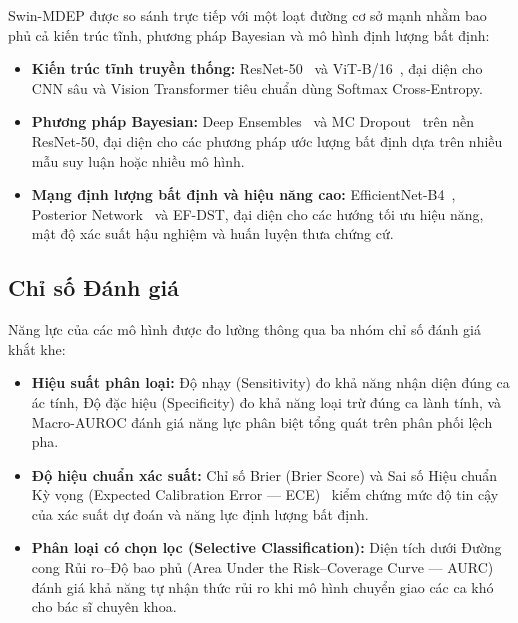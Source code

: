 \documentclass[11pt, a4paper]{article}
\begin{document}
Swin-MDEP được so sánh trực tiếp với một loạt đường cơ sở mạnh nhằm bao phủ cả kiến trúc tĩnh, phương pháp Bayesian và mô hình định lượng bất định:
\begin{itemize}
    \item \textbf{Kiến trúc tĩnh truyền thống:} ResNet-50~\cite{he2016deep} và ViT-B/16~\cite{dosovitskiy2021image}, đại diện cho CNN sâu và Vision Transformer tiêu chuẩn dùng Softmax Cross-Entropy.
    \item \textbf{Phương pháp Bayesian:} Deep Ensembles~\cite{lakshminarayanan2017simple} và MC Dropout~\cite{gal2016dropout} trên nền ResNet-50, đại diện cho các phương pháp ước lượng bất định dựa trên nhiều mẫu suy luận hoặc nhiều mô hình.
    \item \textbf{Mạng định lượng bất định và hiệu năng cao:} EfficientNet-B4~\cite{tan2019efficientnet}, Posterior Network~\cite{charpentier2020posterior} và EF-DST, đại diện cho các hướng tối ưu hiệu năng, mật độ xác suất hậu nghiệm và huấn luyện thưa chứng cứ.
\end{itemize}

\subsection{Chỉ số Đánh giá}\label{subsec:metrics}

Năng lực của các mô hình được đo lường thông qua ba nhóm chỉ số đánh giá khắt khe:
\begin{itemize}
    \item \textbf{Hiệu suất phân loại:} Độ nhạy (Sensitivity) đo khả năng nhận diện đúng ca ác tính, Độ đặc hiệu (Specificity) đo khả năng loại trừ đúng ca lành tính, và Macro-AUROC đánh giá năng lực phân biệt tổng quát trên phân phối lệch pha.
    \item \textbf{Độ hiệu chuẩn xác suất:} Chỉ số Brier (Brier Score) và Sai số Hiệu chuẩn Kỳ vọng (Expected Calibration Error --- ECE)~\cite{naeini2015obtaining} kiểm chứng mức độ tin cậy của xác suất dự đoán và năng lực định lượng bất định.
    \item \textbf{Phân loại có chọn lọc (Selective Classification):} Diện tích dưới Đường cong Rủi ro--Độ bao phủ (Area Under the Risk--Coverage Curve --- AURC)~\cite{geifman2017selective, geifman2019selectivenet, jaeger2023call} đánh giá khả năng tự nhận thức rủi ro khi mô hình chuyển giao các ca khó cho bác sĩ chuyên khoa.
\end{itemize}

\end{document}

